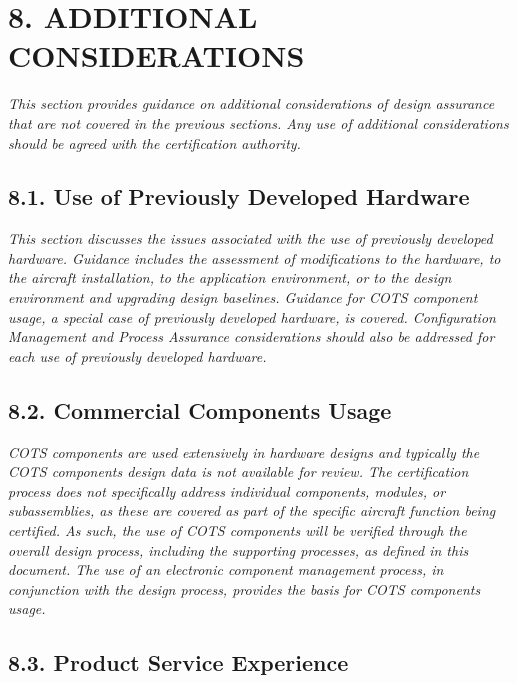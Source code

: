 \documentclass[
]{article}
\begin{document}
\hypertarget{additional-considerations}{%
\section{8. ADDITIONAL CONSIDERATIONS}\label{additional-considerations}}

\emph{This section provides guidance on additional considerations of
design assurance that are not covered in the previous sections. Any use
of additional considerations should be agreed with the certification
authority.}

\hypertarget{use-of-previously-developed-hardware}{%
\subsection{8.1. Use of Previously Developed
Hardware}\label{use-of-previously-developed-hardware}}

\emph{This section discusses the issues associated with the use of
previously developed hardware. Guidance includes the assessment of
modifications to the hardware, to the aircraft installation, to the
application environment, or to the design environment and upgrading
design baselines. Guidance for COTS component usage, a special case of
previously developed hardware, is covered. Configuration Management and
Process Assurance considerations should also be addressed for each use
of previously developed hardware.}

\hypertarget{commercial-components-usage}{%
\subsection{8.2. Commercial Components
Usage}\label{commercial-components-usage}}

\emph{COTS components are used extensively in hardware designs and
typically the COTS components design data is not available for review.
The certification process does not specifically address individual
components, modules, or subassemblies, as these are covered as part of
the specific aircraft function being certified. As such, the use of COTS
components will be verified through the overall design process,
including the supporting processes, as defined in this document. The use
of an electronic component management process, in conjunction with the
design process, provides the basis for COTS components usage.}

\hypertarget{product-service-experience}{%
\subsection{8.3. Product Service
Experience}\label{product-service-experience}}
\end{document}
